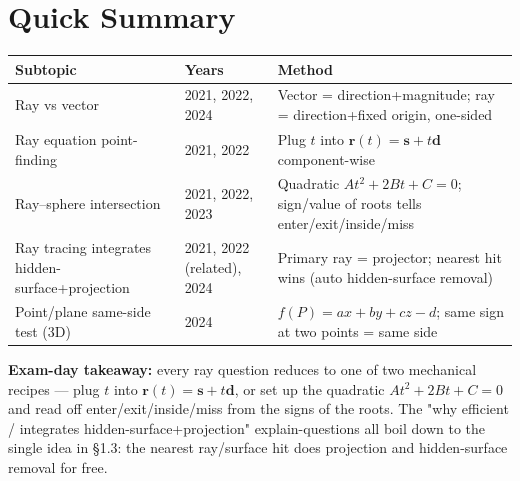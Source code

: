 \documentclass[12pt, a4paper]{article}
\newenvironment{notesbox}{\begin{mdframed}[style=notesframe]}{\end{mdframed}}
\begin{document}
\section{Quick Summary}
\begin{center}
\renewcommand{\arraystretch}{1.3}
\begin{tabular}{p{4.8cm}|p{2.2cm}|p{6.8cm}}
\toprule
\textbf{Subtopic} & \textbf{Years} & \textbf{Method} \\
\midrule
Ray vs vector & 2021, 2022, 2024 & Vector = direction+magnitude; ray = direction+fixed origin, one-sided \\
Ray equation point-finding & 2021, 2022 & Plug $t$ into $\mathbf{r}(t)=\mathbf{s}+t\mathbf{d}$ component-wise \\
Ray--sphere intersection & 2021, 2022, 2023 & Quadratic $At^2+2Bt+C=0$; sign/value of roots tells enter/exit/inside/miss \\
Ray tracing integrates hidden-surface+projection & 2021, 2022 (related), 2024 & Primary ray = projector; nearest hit wins (auto hidden-surface removal) \\
Point/plane same-side test (3D) & 2024 & $f(P)=ax+by+cz-d$; same sign at two points = same side \\
\bottomrule
\end{tabular}
\end{center}
\begin{notesbox}
\textbf{Exam-day takeaway:} every ray question reduces to one of two mechanical recipes --- plug $t$ into $\mathbf{r}(t)=\mathbf{s}+t\mathbf{d}$, or set up the quadratic $At^2+2Bt+C=0$ and read off enter/exit/inside/miss from the signs of the roots. The "why efficient / integrates hidden-surface+projection" explain-questions all boil down to the single idea in \S1.3: the nearest ray/surface hit does projection and hidden-surface removal for free.
\end{notesbox}
\end{document}
